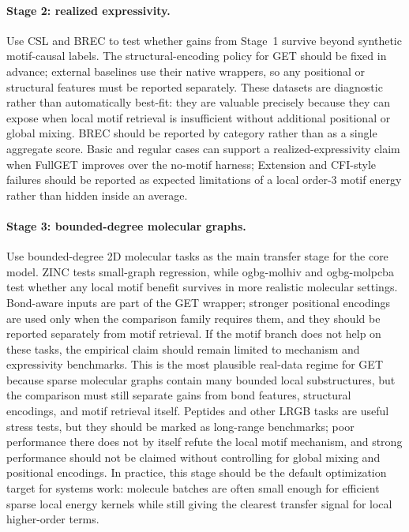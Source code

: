 \documentclass[11pt,a4paper]{article}
\begin{document}
\paragraph{Stage 2: realized expressivity.}
Use CSL and BREC to test whether gains from Stage~1 survive beyond synthetic
motif-causal labels. The structural-encoding policy for GET should be fixed in
advance; external baselines use their native wrappers, so any positional or
structural features must be reported separately. These datasets are diagnostic
rather than automatically best-fit: they are valuable precisely because they
can expose when local motif retrieval is insufficient without additional
positional or global mixing. BREC should be reported by category rather than
as a single aggregate score. Basic and regular cases can support a
realized-expressivity claim when FullGET improves over the no-motif harness; Extension
and CFI-style failures should be reported as expected limitations of a local
order-3 motif energy rather than hidden inside an average.

\paragraph{Stage 3: bounded-degree molecular graphs.}
Use bounded-degree 2D molecular tasks as the main transfer stage for the core
model. ZINC tests small-graph regression, while ogbg-molhiv and ogbg-molpcba
test whether any local motif benefit survives in more realistic molecular
settings.
Bond-aware inputs are part of the GET wrapper; stronger positional encodings
are used only when the comparison family requires them, and they should be
reported separately from motif retrieval. If the motif branch does not help on
these tasks, the empirical claim should remain limited to mechanism and
expressivity benchmarks. This is the most plausible real-data regime for GET
because sparse molecular graphs contain many bounded local substructures, but
the comparison must still separate gains from bond features, structural
encodings, and motif retrieval itself. Peptides and other LRGB tasks are
useful stress tests, but they should be marked as long-range benchmarks; poor
performance there does not by itself refute the local motif mechanism, and
strong performance should not be claimed without controlling for global mixing
and positional encodings. In practice, this stage should be the default
optimization target for systems work: molecule batches are often small enough
for efficient sparse local energy kernels while still giving the clearest
transfer signal for local higher-order terms.
\end{document}
